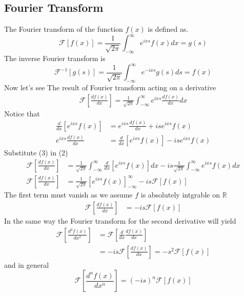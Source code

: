 \documentclass[]{article}
\begin{document}
\subsection{Fourier Transform}
The Fourier transform of the function $f(x)$ is defined as.
\[
    \mathscr{F}\left[f\left(x\right)\right]=\frac{1}{\sqrt{2\pi}}\int_{-\infty}^{\infty}e^{ixs}f\left(x\right)dx= g\left(s\right)    
\] 
The inverse Fourier transform is 
\[
    \mathscr{F}^{-1}\left[g\left(s\right)\right]=\frac{1}{\sqrt{2\pi}}\int_{-\infty}^{\infty}e^{-ixs}g\left(s\right)ds= f\left(x\right)    
\]
\setcounter{equation}{0}
Now let's see The result of Fourier transform acting on a derivative
\begin{align}
    \mathscr{F}\left[\frac{df\left(x\right)}{dx}\right]=\frac{1}{\sqrt{2\pi}}\int_{-\infty}^{\infty}e^{ixs}\frac{df\left(x\right)}{dx}dx
\end{align}
Notice that
\begin{align}
\frac{d}{dx}\left[e^{ixs}f\left(x\right)\right] &= e^{ixs}\frac{df\left(x\right)}{dx} + ise^{ixs}f\left(x\right)
\\
e^{ixs}\frac{df\left(x\right)}{dx} &= \frac{d}{dx}\left[e^{ixs}f\left(x\right)\right] -ise^{ixs}f\left(x\right)
\end{align}
Substitute (3) in (2)
\begin{align*}
\mathscr{F}\left[\frac{df\left(x\right)}{dx}\right] &= \frac{1}{\sqrt{2\pi}}
\int_{-\infty}^{\infty}\frac{d}{dx}\left[e^{ixs}f\left(x\right)\right]dx - is\frac{1}{\sqrt{2\pi}}\int_{-\infty}^{\infty}e^{ixs}f\left(x\right)dx
\\
\mathscr{F}\left[\frac{df\left(x\right)}{dx}\right] &= \frac{1}{\sqrt{2\pi}}{\left[e^{ixs}f\left(x\right)\right]}_{-\infty}^{\infty} - is \mathscr{F}\left[f\left(x\right)\right]
\end{align*}
The first term must vanish as we assume $f$ is absolutely intgrable on $\mathbb{R}$
\begin{align*}
\mathscr{F}\left[\frac{df\left(x\right)}{dx}\right] &= - is \mathscr{F}\left[f\left(x\right)\right]
\end{align*}
In the same way the Fourier transform for the second derivative will yield
\begin{align*}
\mathscr{F}\left[\frac{d^2f\left(x\right)}{dx^2}\right] &=  \mathscr{F}\left[\frac{d}{dx}\frac{df\left(x\right)}{dx}\right]
\\
&= - is\mathscr{F}\left[\frac{df\left(x\right)}{dx}\right] = -s^2 \mathscr{F}\left[f\left(x\right)\right]
\end{align*}
and in general
\[
    \mathscr{F}\left[\frac{d^nf\left(x\right)}{dx^n}\right] = {(-is)}^n\mathscr{F}\left[f\left(x\right)\right]    
\]
\setcounter{equation}{0}
\end{document}
